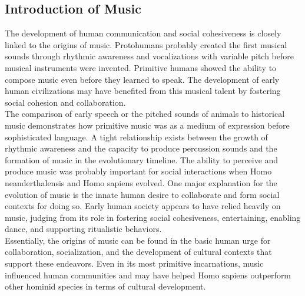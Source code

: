 

\subsection{Introduction of Music}
The development of human communication and social cohesiveness is closely linked to the origins of music. 
Protohumans probably created the first musical sounds through rhythmic awareness and vocalizations with variable pitch before musical instruments were invented. 
Primitive humans showed the ability to compose music even before they learned to speak. 
The development of early human civilizations may have benefited from this musical talent by fostering social cohesion and collaboration.
\\
\indent The comparison of early speech or the pitched sounds of animals to historical music demonstrates how primitive music was as a medium of expression before sophisticated language. 
A tight relationship exists between the growth of rhythmic awareness and the capacity to produce percussion sounds and the formation of music in the evolutionary timeline.
The ability to perceive and produce music was probably important for social interactions when Homo neanderthalensis and Homo sapiens evolved.
One major explanation for the evolution of music is the innate human desire to collaborate and form social contexts for doing so. 
Early human society appears to have relied heavily on music, judging from its role in fostering social cohesiveness, entertaining, enabling dance, and supporting ritualistic behaviors.
\\
\indent Essentially, the origins of music can be found in the basic human urge for collaboration, socialization, and the development of cultural contexts that support these endeavors. 
Even in its most primitive incarnations, music influenced human communities and may have helped Homo sapiens outperform other hominid species in terms of cultural development.

